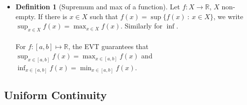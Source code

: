\documentclass{article}
\newcommand{\R}{\mathbb{R}}
\newcommand{\N}{\mathbb{N}}
\newcommand{\seq}[2]{(#1_{#2})_{#2 \in \N}}
\newcommand{\sseq}[3]{(#1_{#2_#3})_{#3 \in \N}}
\newcommand{\?}{\stackrel{?}{=}}
\theoremstyle{definition} %
\newtheorem{definition}[theorem]{Definition} %
\begin{document}
\begin{itemize}
\begin{proof}
              Now we must show that $f$ bounded $\implies X$ bounded $\implies M = \sup(X)$ and $m = \inf(X)$ exists. So we need to show that $M = f(x_g), x_g \in [a, b]$ and $m = f(x_i), x_i \in [a, b]$. From the characterization of infimum, we know $\forall \varepsilon > 0 \ \exists q_\epsilon \in X$ such that $q_\varepsilon - m \leq \varepsilon$. Then we have that $q_\varepsilon \in X \rightarrow f(x_\varepsilon)$, $x_\varepsilon \in [a, b]$. This means that $f(x_\varepsilon) - m \leq \varepsilon$. Taking $\varepsilon = \nicefrac{1}{n}$ we obtain $m \leq f(x_n) \leq m + \nicefrac{1}{n} \implies f(x_n) \rightarrow m$ by the Squeeze Theorem. \\\\
              But $\seq{x}{n}$ bounded implies there exists some subsequence $\sseq{x}{n}{k}$ such that $x_{n_k} \in [a, b] \implies x_{n_k} \rightarrow l \in [a, b]$. So
              $$m = \lim_{k \to \infty} f(x_{n_k}) = f(\lim_{k \to \infty} x_{n_k}) = f(l).$$
              Take $x_i = l \in [a, b]$.
          \end{proof}
    \item[]
          \begin{definition}[Supremum and max of a function]
              Let $f: X \to \R$, $X$ non-empty. If there is $x \in X$ such that $f(x) = \sup\{f(x) \ : \ x \in X\}$, we write $\sup_{x \in X} f(x) = \max_{x \in X} f(x)$. Similarly for $\inf$. \\\\
              For $f: [a, b] \mapsto \R$, the EVT guarantees that $\sup_{x \in [a, b]} f(x) = \max_{x \in [a, b]} f(x)$ and $\inf_{x \in [a, b]} f(x) = \min_{x \in [a, b]} f(x)$.
          \end{definition}
\end{itemize}

\subsection{Uniform Continuity}
\end{document}
